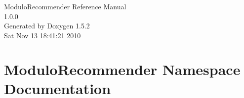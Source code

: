 \documentclass[a4paper]{book}
\begin{document}
\begin{titlepage}
\vspace*{7cm}
\begin{center}
{\Large ModuloRecommender Reference Manual\\[1ex]\large 1.0.0 }\\
\vspace*{1cm}
{\large Generated by Doxygen 1.5.2}\\
\vspace*{0.5cm}
{\small Sat Nov 13 18:41:21 2010}\\
\end{center}
\end{titlepage}
\clearemptydoublepage
{}
\tableofcontents
\clearemptydoublepage
{}
\chapter{ModuloRecommender Namespace Documentation}























\end{document}
